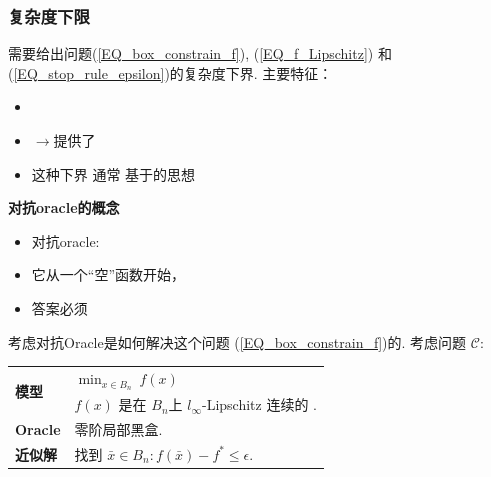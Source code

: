 \documentclass[handout]{beamer}
\begin{document}
\begin{frame}[allowframebreaks]
\frametitle{复杂度下限}


需要给出问题(\ref{EQ_box_constrain_f}), (\ref{EQ_f_Lipschitz}) 和  (\ref{EQ_stop_rule_epsilon})的复杂度下界.
主要特征： 

 \begin{itemize}
\item  {} 
\item {}   $\rightarrow$提供了
\item 这种下界 通常 基于的思想  
\end{itemize}


\framebreak

\textbf{对抗oracle的概念}

\begin{itemize}
\item 对抗oracle:  
\item  它从一个“空”函数开始， 
\item  答案必须 
\end{itemize}

\framebreak

考虑对抗Oracle是如何解决这个问题 (\ref{EQ_box_constrain_f})的. 考虑问题 $\mathcal{C}$:
\bigskip

\begin{center}
	 
\begin{tabular}{|l|l|}
\hline
\multirow{2}{*}{\textbf{模型}} &  $\min_{x\in B_n}^{} \ f(x) $ \\
            &  $f(x)$ 是在 $B_n$上 $l_\infty$-Lipschitz 连续的 . \\[2ex]
\hline
 \textbf{Oracle}  &  零阶局部黑盒. \\[2ex]
 \hline
\textbf{近似解}&  找到 $\bar{x}\in B_n : f(\bar{x})-f^* \leq \epsilon$. \\[2ex]
\hline
\end{tabular}

\end{center}



\end{frame}
\end{document}
